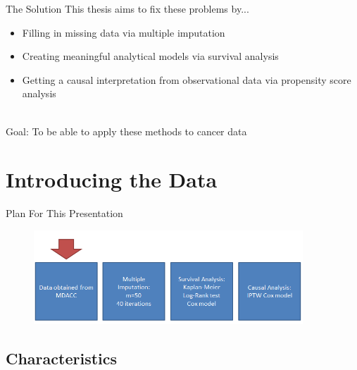 \begin{frame}{The Solution}
This thesis aims to fix these problems by...
  \begin{itemize}
   \item Filling in missing data via multiple imputation
   \item Creating meaningful analytical models via survival analysis
   \item Getting a causal interpretation from observational data via propensity score analysis\\~\\
  \end{itemize}
Goal: To be able to apply these methods to cancer data

\end{frame}


\section{Introducing the Data}
\begin{frame}[noframenumbering]{Plan For This Presentation}
  \begin{figure}[h!]
  \centering
    \includegraphics[width=0.9\textwidth]{data_flow}
\label{fig:data_flow}
\end{figure} 
\end{frame}

\subsection{Characteristics}

